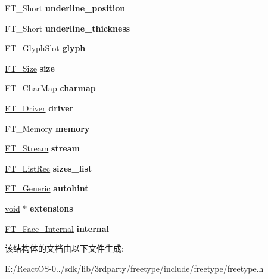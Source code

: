 \begin{DoxyCompactItemize}
\item 
\mbox{\label{struct_f_t___face_rec___ac4f899e32a37a89794d6c160a26937e1}} 
F\+T\+\_\+\+Short {\bfseries underline\+\_\+position}
\item 
\mbox{\label{struct_f_t___face_rec___a61adda036bab17c419c358a31693e680}} 
F\+T\+\_\+\+Short {\bfseries underline\+\_\+thickness}
\item 
\mbox{\label{struct_f_t___face_rec___aea701e6584693e684acf300edb28d8f6}} 
\hyperlink{struct_f_t___glyph_slot_rec__}{F\+T\+\_\+\+Glyph\+Slot} {\bfseries glyph}
\item 
\mbox{\label{struct_f_t___face_rec___a212d116864a5d81e80b176f9b846cd08}} 
\hyperlink{struct_f_t___size_rec__}{F\+T\+\_\+\+Size} {\bfseries size}
\item 
\mbox{\label{struct_f_t___face_rec___aca87d50488a5a1489741e8c13414c268}} 
\hyperlink{struct_f_t___char_map_rec__}{F\+T\+\_\+\+Char\+Map} {\bfseries charmap}
\item 
\mbox{\label{struct_f_t___face_rec___a011b62fcffdd6dc421c9ab3286d4c9fa}} 
\hyperlink{struct_f_t___driver_rec__}{F\+T\+\_\+\+Driver} {\bfseries driver}
\item 
\mbox{\label{struct_f_t___face_rec___af269b241bfc2f570d485ab03fc0261b2}} 
F\+T\+\_\+\+Memory {\bfseries memory}
\item 
\mbox{\label{struct_f_t___face_rec___a831d5da25cd0fe2a783d2a73f467de55}} 
\hyperlink{struct_f_t___stream_rec__}{F\+T\+\_\+\+Stream} {\bfseries stream}
\item 
\mbox{\label{struct_f_t___face_rec___a47504203e02bfba59c802c35cb4009ed}} 
\hyperlink{struct_f_t___list_rec__}{F\+T\+\_\+\+List\+Rec} {\bfseries sizes\+\_\+list}
\item 
\mbox{\label{struct_f_t___face_rec___a34ba9b1367f1b2d13676043b8da3ea73}} 
\hyperlink{struct_f_t___generic__}{F\+T\+\_\+\+Generic} {\bfseries autohint}
\item 
\mbox{\label{struct_f_t___face_rec___a8b24f993e38da597d3e0273267890f49}} 
\hyperlink{interfacevoid}{void} $\ast$ {\bfseries extensions}
\item 
\mbox{\label{struct_f_t___face_rec___aed9a1267cddcbe790f0591471c886537}} 
\hyperlink{struct_f_t___face___internal_rec__}{F\+T\+\_\+\+Face\+\_\+\+Internal} {\bfseries internal}
\end{DoxyCompactItemize}


该结构体的文档由以下文件生成\+:\begin{DoxyCompactItemize}
\item 
E\+:/\+React\+O\+S-\/0../sdk/lib/3rdparty/freetype/include/freetype/freetype.\+h\end{DoxyCompactItemize}
